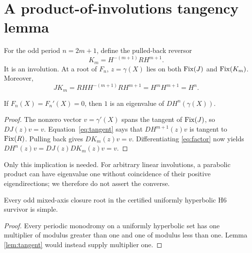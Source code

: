 \section{A product-of-involutions tangency lemma}

For the odd period $n=2m+1$, define the pulled-back reversor
\[
K_m=H^{-(m+1)}RH^{m+1}.
\]
It is an involution.  At a root of $F_n$, $z=\gamma(X)$ lies on both
$\operatorname{Fix}(J)$ and $\operatorname{Fix}(K_m)$.  Moreover,
\begin{equation}\label{eq:factor}
JK_m=RH H^{-(m+1)}RH^{m+1}=H^mH^{m+1}=H^n.
\end{equation}

\begin{lemma}\label{lem:tangent}
If $F_n(X)=F_n'(X)=0$, then $1$ is an eigenvalue of $DH^n(\gamma(X))$.
\end{lemma}

\begin{proof}
The nonzero vector $v=\gamma'(X)$ spans the tangent of $\operatorname{Fix}(J)$, so
$DJ(z)v=v$.  Equation~\eqref{eq:tangent} says that
$DH^{m+1}(z)v$ is tangent to $\operatorname{Fix}(R)$.  Pulling back gives
$DK_m(z)v=v$.  Differentiating \eqref{eq:factor} now yields
$DH^n(z)v=DJ(z)DK_m(z)v=v$.
\end{proof}

Only this implication is needed.  For arbitrary linear involutions, a
parabolic product can have eigenvalue one without coincidence of their
positive eigendirections; we therefore do not assert the converse.

\begin{corollary}\label{cor:hyperbolic}
Every odd mixed-axis closure root in the certified uniformly hyperbolic H6
survivor is simple.
\end{corollary}

\begin{proof}
Every periodic monodromy on a uniformly hyperbolic set has one multiplier of
modulus greater than one and one of modulus less than one.  Lemma
\ref{lem:tangent} would instead supply multiplier one.
\end{proof}
